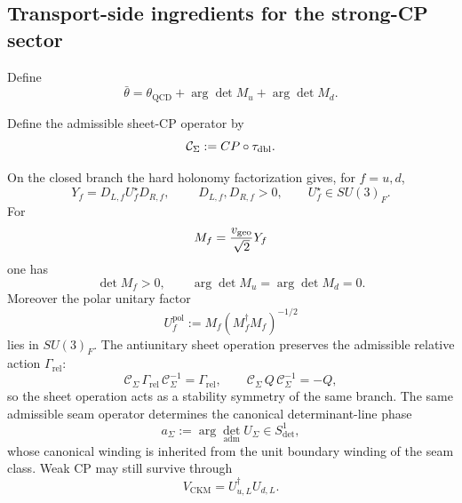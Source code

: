 \subsection{Transport-side ingredients for the strong-CP sector}

Define
\begin{equation}
\label{eq:strong-cp}
\bar\theta=\theta_{\mathrm{QCD}}+\arg\det M_u+\arg\det M_d.
\end{equation}
\begin{definition}
\label{def:sheet-cp-symmetry}
Define the admissible sheet-CP operator by
\[
\mathcal C_\Sigma:=CP\circ\tau_{\mathrm{dbl}}.
\]
\end{definition}

\begin{theorem}
\label{thm:sheet-cp-protection}
\label{thm:structural-strong-cp}
On the closed branch the hard holonomy factorization gives, for $f=u,d$,
\[
Y_f=D_{L,f}U_f^\star D_{R,f},
\qquad
\;D_{L,f},D_{R,f}>0,
\qquad
U_f^\star\in SU(3)_F.
\]
For
\[
M_f=\frac{v_{\mathrm{geo}}}{\sqrt2}Y_f
\]
one has
\[
\det M_f>0,
\qquad
\arg\det M_u=\arg\det M_d=0.
\]
Moreover the polar unitary factor
\[
U_f^{\mathrm{pol}}:=M_f(M_f^\dagger M_f)^{-1/2}
\]
lies in $SU(3)_F$. The antiunitary sheet operation
preserves the admissible relative action $\Gamma_{\mathrm{rel}}$:
\[
\mathcal C_\Sigma\,\Gamma_{\mathrm{rel}}\,\mathcal C_\Sigma^{-1}=\Gamma_{\mathrm{rel}},
\qquad
\mathcal C_\Sigma\,Q\,\mathcal C_\Sigma^{-1}=-Q,
\]
so the sheet operation acts as a stability symmetry of the same branch. The same admissible seam
operator determines the canonical determinant-line phase
\[
a_\Sigma:=\arg\det_{\mathrm{adm}}U_\Sigma\in S^1_{\det},
\]
whose canonical winding is inherited from the unit boundary winding of the seam class. Weak CP may
still survive through
\[
V_{\mathrm{CKM}}=U_{u,L}^\dagger U_{d,L}.
\]
\end{theorem}

